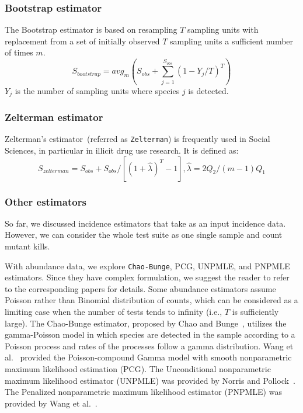 \documentclass[sigconf]{acmart}
\newcommand{\Zelterman}{Zelterman\xspace}
\newcommand{\ChaoBunge}{Chao-Bunge\xspace}
\newcommand{\Unpmle}{UNPMLE\xspace}
\newcommand{\Bootstrap}{Bootstrap\xspace}
\newcommand{\Pnpmle}{PNPMLE\xspace}
\newcommand{\PCG}{PCG\xspace}
\def\<#1>{\texttt{#1}}
\begin{document}
\subsubsection{Bootstrap estimator~\cite{smith1984nonparametric}}
The \Bootstrap estimator
is based on resampling $T$ sampling units with replacement from a set of
initially observed $T$ sampling units a sufficient number of times $m$.
\begin{displaymath}
S_{bootstrap}  = {avg}_{m}( S_{obs} + \sum^{S_{obs}}_{j=1} (1 - Y_j/T)^T)
\end{displaymath}
$Y_{j}$ is the number of sampling units %
where species $j$ is detected.

\subsubsection{\Zelterman estimator~\cite{bohning2010some}}
Zelterman's estimator~(referred as \<Zelterman>) is frequently used in Social Sciences, in particular in illicit drug use research.
It is defined as:
\begin{displaymath}
    S_{zelterman} = S_{obs} + S_{obs}/[(1+\hat{\lambda})^T - 1], \hat{\lambda} = 2Q_2/(m-1)Q_1
\end{displaymath}

\subsubsection{Other estimators}
So far, we discussed incidence estimators that take as an input incidence data.
However, we can consider the whole test suite as one single sample and count mutant kills.



With abundance data, we explore \<\ChaoBunge>, \PCG, \Unpmle, and \Pnpmle estimators.
Since they have complex formulation, we suggest the reader to refer to the corresponding papers for details.
Some abundance estimators assume Poisson rather than Binomial distribution of counts, which can be considered as a limiting case when the number of tests tends to infinity
(i.e., $T$ is sufficiently large).
The \ChaoBunge estimator, proposed by Chao and Bunge~\cite{chao2002estimating},
utilizes the gamma-Poisson model in which species are detected in the sample
according to a Poisson process and rates of the processes follow a gamma distribution.
Wang et al.~\cite{wang2010estimating} provided the Poisson-compound Gamma model with smooth nonparametric maximum likelihood estimation (\PCG).
The Unconditional nonparametric maximum likelihood estimator (\Unpmle)
was provided by Norris and Pollock~\cite{norris1998non}.
The Penalized nonparametric maximum likelihood estimator (\Pnpmle)
was provided by Wang et al.~\cite{wang2005penalized}.
\end{document}

